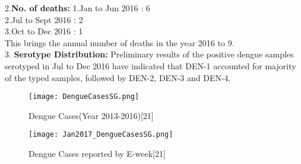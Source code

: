 \documentclass[11pt]{exam}
\begin{document}
\begin{questions}
2.\textbf{No. of deaths:} 1.Jan to Jun 2016 : 6 \\
                          2.Jul to Sept 2016 : 2 \\
                          3.Oct to Dec 2016 : 1\\
This brings the annual number of deaths in the year 2016 to 9. \\
                          
3. \textbf{Serotype Distribution:} Preliminary results of the positive dengue samples serotyped in Jul to Dec 2016 have indicated that DEN-1 accounted for majority of the typed samples, followed by DEN-2, DEN-3 and DEN-4. \\ 

\begin{figure}[H]
  \centering
   \texttt{[image: DengueCasesSG.png]}
  \caption{Dengue Cases(Year 2013-2016)[21]}
   \label{Dengue Cases in Singapore 2013-2017}
\end{figure} 

\begin{figure}[H]
  \centering
   \texttt{[image: Jan2017\_DengueCasesSG.png]}
  \caption{Dengue Cases reported by E-week[21]} %
   \label{Dengue Cases reported by E-week}
\end{figure} 

%
%
%
%







\end{questions}
\end{document}
